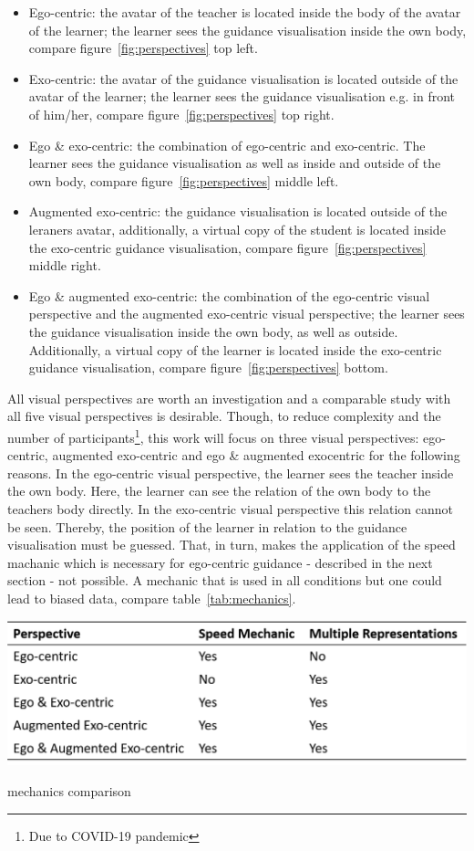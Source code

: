 \begin{itemize}
	\item Ego-centric: the avatar of the teacher is located inside the body of the avatar of the learner; the learner sees the guidance visualisation inside the own body, compare figure~\ref{fig:perspectives} top left.
	\item Exo-centric: the avatar of the guidance visualisation is located outside of the avatar of the learner; the learner sees the guidance visualisation e.g. in front of him/her, compare figure~\ref{fig:perspectives} top right.
	\item Ego \& exo-centric: the combination of ego-centric and exo-centric. The learner sees the guidance visualisation as well as inside and outside of the own body, compare figure~\ref{fig:perspectives} middle left.
	\item Augmented exo-centric: the guidance visualisation is located outside of the leraners avatar, additionally, a virtual copy of the student is located inside the exo-centric guidance visualisation, compare figure~\ref{fig:perspectives} middle right.
	\item Ego \& augmented exo-centric: the combination of the ego-centric visual perspective and the augmented exo-centric visual perspective; the learner sees the guidance visualisation inside the own body, as well as outside. Additionally, a virtual copy of the learner is located inside the exo-centric guidance visualisation, compare figure~\ref{fig:perspectives} bottom.	
\end{itemize}
All visual perspectives are worth an investigation and a comparable study with all five visual perspectives is desirable. Though, to reduce complexity and the number of participants\footnote{Due to COVID-19 pandemic}, this work will focus on three visual perspectives: ego-centric, augmented exo-centric and ego \& augmented exocentric for the following reasons. In the ego-centric visual perspective, the learner sees the teacher inside the own body. Here, the learner can see the relation of the own body to the teachers body directly. In the exo-centric visual perspective this relation cannot be seen. Thereby, the position of the learner in relation to the guidance visualisation must be guessed. That, in turn, makes the application of the speed machanic which is necessary for ego-centric guidance - described in the next section - not possible. A mechanic that is used in all conditions but one could lead to biased data, compare table~\ref{tab:mechanics}.
\begin{table}[htb]
	\centering
	\includegraphics[width=\textwidth]{figures/mechanics_comparison.png}
	\caption[mechanics comparison]{mechanics comparison}
	\label{tab:mechanics}
\end{table}
